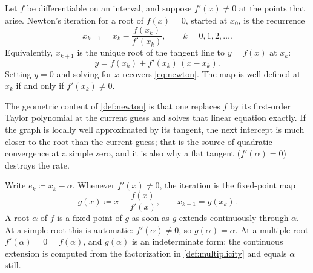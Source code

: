 \begin{definition}
\label{def:newton}
Let \(f\) be differentiable on an interval, and suppose \(f'(x)\neq 0\) at the points that arise. Newton's iteration for a root of \(f(x)=0\), started at \(x_0\), is the recurrence
\begin{equation}
\label{eq:newton}
x_{k+1}
=
x_k
-
\frac{f(x_k)}{f'(x_k)},
\qquad
k=0,1,2,\dots.
\end{equation}
Equivalently, \(x_{k+1}\) is the unique root of the tangent line to \(y=f(x)\) at \(x_k\):
\[
y
=
f(x_k)
+
f'(x_k)\,(x-x_k).
\]
Setting \(y=0\) and solving for \(x\) recovers \eqref{eq:newton}. The map is well-defined at \(x_k\) if and only if \(f'(x_k)\neq 0\).
\end{definition}

The geometric content of \cref{def:newton} is that one replaces \(f\) by its first-order Taylor polynomial at the current guess and solves that linear equation exactly. If the graph is locally well approximated by its tangent, the next intercept is much closer to the root than the current guess; that is the source of quadratic convergence at a simple zero, and it is also why a flat tangent (\(f'(\alpha)=0\)) destroys the rate.

\begin{center}
\end{center}

\begin{notation}
\label{not:newton-map}
Write \(e_k\coloneqq x_k-\alpha\). Whenever \(f'(x)\neq 0\), the iteration is the fixed-point map
\[
g(x)
\coloneqq
x
-
\frac{f(x)}{f'(x)},
\qquad
x_{k+1}=g(x_k).
\]
A root \(\alpha\) of \(f\) is a fixed point of \(g\) as soon as \(g\) extends continuously through \(\alpha\). At a simple root this is automatic: \(f'(\alpha)\neq 0\), so \(g(\alpha)=\alpha\). At a multiple root \(f'(\alpha)=0=f(\alpha)\), and \(g(\alpha)\) is an indeterminate form; the continuous extension is computed from the factorization in \cref{def:multiplicity} and equals \(\alpha\) still.
\end{notation}

